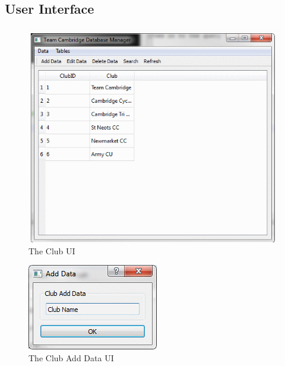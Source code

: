 \subsection{User Interface}

\clearpage

\begin{figure}
\includegraphics[width=\textwidth]{./Maintenance/UI/Club.png}
\caption{The Club UI} \label{fig:club_UI}
\end{figure}

\begin{figure}
\includegraphics[width=\textwidth]{./Maintenance/UI/ClubAD.png}
\caption{The Club Add Data UI} \label{fig:ClubAD_UI}
\end{figure}

